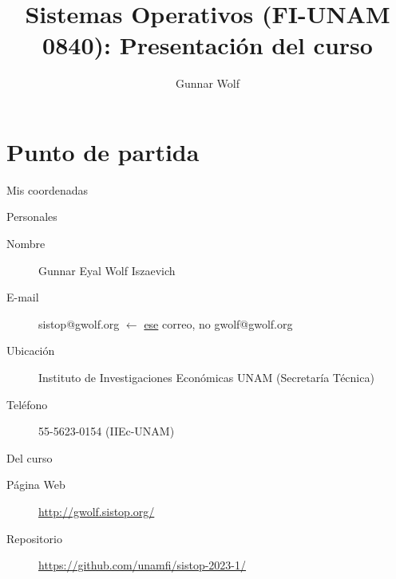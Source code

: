 \documentclass[presentation]{beamer}
\author{Gunnar Wolf}
\date{}
\title{Sistemas Operativos (FI-UNAM 0840): Presentación del curso}
\begin{document}
\maketitle

\section{Punto de partida}
\label{sec:orgaabd153}

\begin{frame}[label={sec:org4a48afe}]{Mis coordenadas}
\begin{center}
Personales
\end{center}

\begin{description}
\item[{Nombre}] Gunnar Eyal Wolf Iszaevich
\item[{E-mail}] sistop@gwolf.org \(\leftarrow\) \uline{ese} correo, no gwolf@gwolf.org
\item[{Ubicación}] Instituto de Investigaciones Económicas UNAM
(Secretaría Técnica)
\item[{Teléfono}] 55-5623-0154 (IIEc-UNAM)
\end{description}

\begin{center}
Del curso
\end{center}

\begin{description}
\item[{Página Web}] \url{http://gwolf.sistop.org/}
\item[{Repositorio}] \small \url{https://github.com/unamfi/sistop-2023-1/}
\end{description}
\end{frame}
\end{document}
